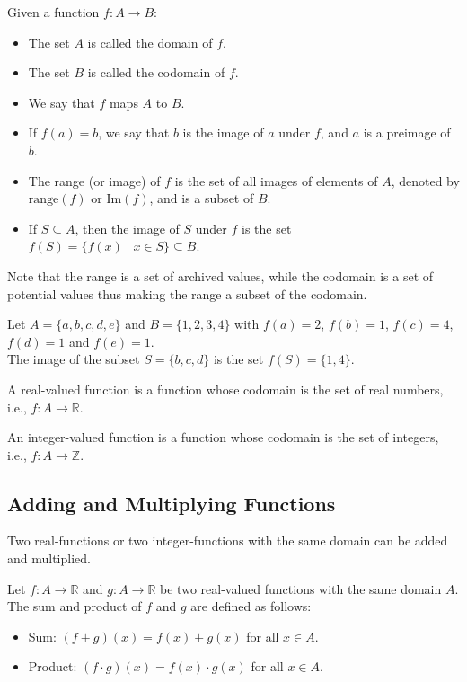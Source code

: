 \begin{definition}
    Given a function $f: A \to B$:
    \begin{itemize}[itemsep=1pt,label=$\circ$]
        \item The set $A$ is called the domain of $f$.
        \item The set $B$ is called the codomain of $f$.
        \item We say that $f$ maps $A$ to $B$.
        \item If $f(a) = b$, we say that $b$ is the image of $a$ under $f$, and $a$ is a preimage of $b$.
        \item The range (or image) of $f$ is the set of all images of elements of $A$, denoted by $\text{range}(f)$ or $\text{Im}(f)$, and is a subset of $B$.
        \item If $S \subseteq A$, then the image of $S$ under $f$ is the set $f(S) = \{f(x) \mid x \in S\} \subseteq B$.
    \end{itemize}
\end{definition}
Note that the range is a set of archived values, while the codomain is a set of potential values thus making the range a subset of the codomain.

\begin{eg}
    Let $A = \{a,b,c,d,e\}$ and $B = \{1,2,3,4\}$ with $f(a) = 2$, $f(b) = 1$, $f(c) = 4$, $f(d) = 1$ and $f(e) = 1$. \\ 
    The image of the subset $S = \{b,c,d\}$ is the set $f(S) = \{1,4\}$.
\end{eg}

\begin{definition}
    A real-valued function is a function whose codomain is the set of real numbers, i.e., $f: A \to \mathbb{R}$.
\end{definition}

\begin{definition}
    An integer-valued function is a function whose codomain is the set of integers, i.e., $f: A \to \mathbb{Z}$.
\end{definition}

\subsection{Adding and Multiplying Functions}
Two real-functions or two integer-functions with the same domain can be added and multiplied.
\begin{definition}
    Let $f: A \to \mathbb{R}$ and $g: A \to \mathbb{R}$ be two real-valued functions with the same domain $A$. The sum and product of $f$ and $g$ are defined as follows:
    \begin{itemize}[itemsep=1pt,label=$\circ$]
        \item Sum: $(f + g)(x) = f(x) + g(x)$ for all $x \in A$.
        \item Product: $(f \cdot g)(x) = f(x) \cdot g(x)$ for all $x \in A$.
    \end{itemize}
\end{definition}

